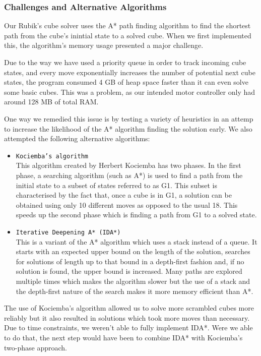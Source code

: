\documentclass[8pt]{article}
\begin{document}
\subsubsection{Challenges and Alternative Algorithms}

Our Rubik's cube solver uses the A* path finding algorithm to find the shortest path
from the cube's inintial state to a solved cube. When we first implemented this,
the algorithm's memory usage presented a major challenge.

Due to the way we have used a priority queue in order to track incoming cube states,
and every move exponentially increases the number of potential next cube states, the
program consumed 4 GB of heap space faster than it can even solve some basic cubes.
This was a problem, as our intended motor controller only had around 128 MB of total RAM.

One way we remedied this issue is by testing a variety of heuristics in an attemp to
increase the likelihood of the A* algorithm finding the solution early. We also attempted
the following alternative algorithms:
\begin{itemize}
    \item \texttt{Kociemba's algorithm} \\ This algorithm created by Herbert Kociemba
    has two phases. In the first phase, a searching algorithm (such as A*)
    is used to find a path from the initial state to a subset of states referred to as G1.
    This subset is characterised by the fact that, once a cube is in G1, a solution can
    be obtained using only 10 different moves as opposed to the usual 18. This speeds up
    the second phase which is finding a path from G1 to a solved state.
    \item \texttt{Iterative Deepening A* (IDA*)} \\ This is a variant of the A* algorithm
    which uses a stack instead of a queue. It starts with an expected upper bound on
    the length of the solution, searches for solutions of length up to that bound in a
    depth-first fashion and, if no solution is found, the upper bound is increased.
    Many paths are explored multiple times which makes the algorithm slower but the use
    of a stack and the depth-first nature of the search makes it more memory efficient than A*.
\end{itemize}

The use of Kociemba's algorithm allowed us to solve more scrambled cubes more reliably but
it also resulted in solutions which took more moves than necessary. Due to time constraints,
we weren't able to fully implement IDA*. Were we able to do that, the next step would have been
to combine IDA* with Kociemba's two-phase approach.
\end{document}
